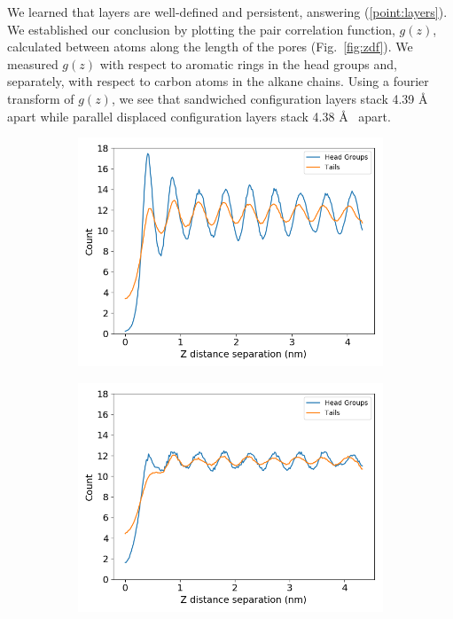 \documentclass{article}
\newcommand{\angstrom}{\textup{\AA}}
\begin{document}
  We learned that layers are well-defined and persistent, answering
  (\ref{point:layers}). We established our conclusion by plotting the pair
  correlation function, $g(z)$, calculated between atoms along the length of the
  pores (Fig.~\ref{fig:zdf}). We measured $g(z)$ with respect to aromatic rings in
  the head groups and, separately, with respect to carbon atoms in the alkane
  chains. Using a fourier transform of $g(z)$, we see that sandwiched
  configuration layers stack 4.39 \angstrom~ apart while parallel displaced
  configuration layers stack 4.38 \angstrom~ apart.

  \begin{figure}
        \centering
        \begin{subfigure}{0.45\textwidth}
                \centering
                \includegraphics[width=\textwidth]{zdf_overlay_layered.png}
                \caption{}\label{fig:zdf_layered}
        \end{subfigure}
        \begin{subfigure}{0.45\textwidth}
                \centering
                \includegraphics[width=\textwidth]{zdf_overlay_offset.png}

\end{subfigure}
\end{figure}
\end{document}
